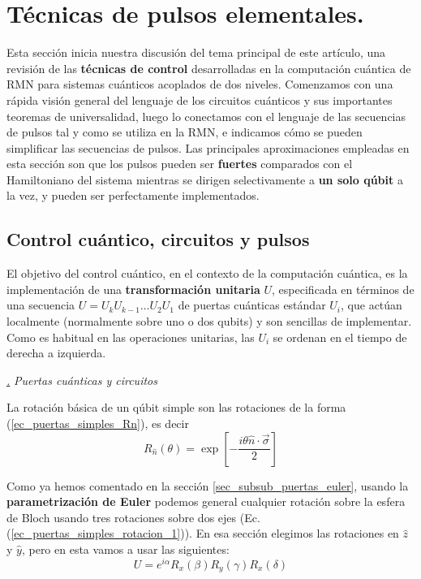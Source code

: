 \documentclass[a4paper,11pt]{book} %
\numberwithin{equation}{chapter}
\def\lc{\left[}
\def\rc{\right]}
\def\subsubiContadorIt{\par\addtocounter{subsubsection}{1}\underline{\it\thesubsubsection.}\hskip0.5cm \setcounter{subsubsubsectionIt}{0}}
\newcommand{\SubsubiIt}[1]{
		\subsubiContadorIt \textit{#1}
	}
\newcounter{subsubsubsectionIt}[subsubsection]
\begin{document}
	\section{Técnicas de pulsos elementales.} \label{sec_sub_Harware_NMR_pulsos} 

Esta sección inicia nuestra discusión del tema principal de este artículo, una revisión de las \textbf{técnicas de control} desarrolladas en la computación cuántica de RMN para sistemas cuánticos acoplados de dos niveles. Comenzamos con una rápida visión general del lenguaje de los circuitos cuánticos y sus importantes teoremas de universalidad, luego lo conectamos con el lenguaje de las secuencias de pulsos tal y como se utiliza en la RMN, e indicamos cómo se pueden simplificar las secuencias de pulsos. Las principales aproximaciones empleadas en esta sección son que los pulsos pueden ser \textbf{fuertes} comparados con el Hamiltoniano del sistema mientras se dirigen selectivamente a \textbf{un solo qúbit} a la vez, y pueden ser perfectamente implementados. 

		\subsection{Control cuántico, circuitos y pulsos}

El objetivo del control cuántico, en el contexto de la computación cuántica, es la implementación de una \textbf{transformación unitaria} $U$, especificada en términos de una secuencia $U = U_k U_{k-1} \dots U_2 U_1$ de puertas cuánticas estándar $U_i$, que actúan localmente (normalmente sobre uno o dos qubits) y son sencillas de implementar. Como es habitual en las operaciones unitarias, las $U_i$ se ordenan en el tiempo de derecha a izquierda.

			\SubsubiIt{Puertas cuánticas y circuitos}

La rotación básica de un qúbit simple son las rotaciones de la forma (\ref{ec_puertas_simples_Rn}), es decir
$$
R_{\hat{n}} (\theta) = \exp \lc - \frac{i \theta \hat{n} \cdot \vec{\sigma}}{2} \rc
$$

Como ya hemos comentado en la sección \ref{sec_subsub_puertas_euler}, usando la \textbf{parametrización de Euler}  podemos general cualquier rotación sobre la esfera de Bloch usando tres rotaciones sobre dos ejes (Ec. (\ref{ec_puertas_simples_rotacion_1})). En esa sección elegimos las rotaciones en $\hat{z}$ y $\hat{y}$, pero en esta vamos a usar las siguientes:
	\begin{equation}
	U = e^{i \alpha} R_x(\beta) R_y (\gamma) R_x (\delta)
	\end{equation}
\end{document}
